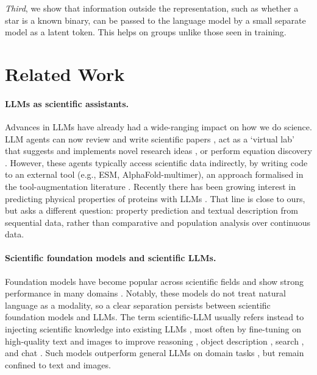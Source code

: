 \emph{Third}, we show that information outside the representation, such as whether a star is a
known binary, can be passed to the language model by a small separate model as a latent token.
This helps on groups unlike those seen in training.

\section{Related Work}\label{sec:related_work}

\paragraph{LLMs as scientific assistants.}
Advances in LLMs have already had a wide-ranging impact on how we do science. LLM agents
can now review and write scientific papers \citep{Villaescusa-Navarro2025_denario,
Zhuang2025}, act as a `virtual lab' that suggests and implements novel research ideas
\citep{swanson_virtual_2025}, or perform equation discovery \citep{Yang2026ThinkLA}.
However, these agents typically access scientific data indirectly, by writing code to an
external tool (e.g., ESM, AlphaFold-multimer), an approach formalised in the
tool-augmentation literature \citep{Schick2023_toolformer, Gao2023_pal}. Recently there
has been growing interest in predicting physical properties of proteins with LLMs
\citep{Zhuo2024ProtLLMAI,Dotan2026_betadescribe}. That line is
close to ours, but asks a different question: property prediction and textual description
from sequential data, rather than comparative and population analysis over continuous
data.

\paragraph{Scientific foundation models and scientific LLMs.}
Foundation models have become popular across scientific fields and show strong
performance in many domains \citep[e.g.,][]{Leung2024, Parker2025_aion, Smith2024_astropt,
euclid_2025_multimodal, Bardhan2025, Hayes2025_ESM3, bodnar_2025_aurora,
abramson_2024_alphafold3}. Notably, these models do not treat natural language as a
modality, so a clear separation persists between scientific foundation models and LLMs.
The term scientific-LLM usually refers instead to injecting scientific knowledge into
existing LLMs \citep[for reviews, see][]{Hu2025_sci_llm, Eger2025_sci_llm}, most often by
fine-tuning on high-quality text and images to improve reasoning \citep{Xie2023_darwin,
Bai2025_intern_s1, Cherian2024_llmphy}, object description \citep{Mishra-Sharma2024},
search \citep{Koblischke2025}, and chat \citep{Zaman2025}. Such models outperform general
LLMs on domain tasks \citep{haan2025_astrosage}, but remain confined to text and images.

